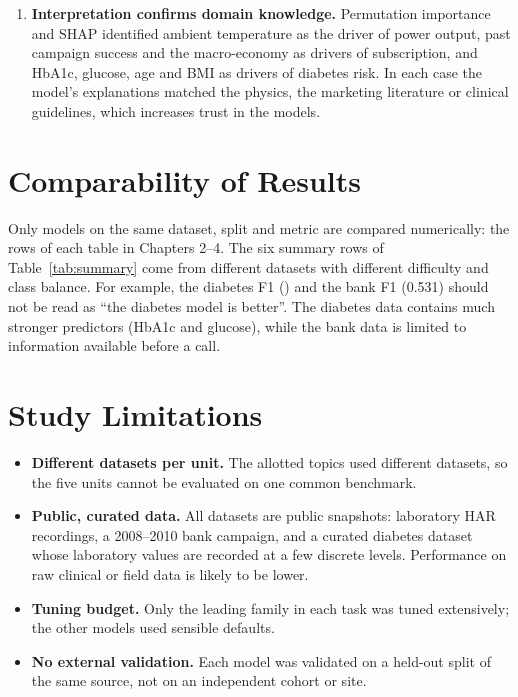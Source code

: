 \begin{enumerate}
\item \textbf{Interpretation confirms domain knowledge.} Permutation importance and SHAP identified ambient temperature
as the driver of power output, past campaign success and the macro-economy as drivers of subscription, and HbA1c,
glucose, age and BMI as drivers of diabetes risk. In each case the model's explanations matched the physics, the
marketing literature or clinical guidelines, which increases trust in the models.
\end{enumerate}

\section{Comparability of Results}
Only models on the same dataset, split and metric are compared numerically: the rows of each table in Chapters 2–4.
The six summary rows of Table~\ref{tab:summary} come from different datasets with different difficulty and class
balance. For example, the diabetes F1 (\dbBestFone) and the bank F1 (0.531) should not be read as ``the diabetes model is
better''. The diabetes data contains much stronger predictors (HbA1c and glucose), while the bank data is limited to
information available before a call.

\section{Study Limitations}
\begin{itemize}
\item \textbf{Different datasets per unit.} The allotted topics used different datasets, so the five units cannot be
evaluated on one common benchmark.
\item \textbf{Public, curated data.} All datasets are public snapshots: laboratory HAR recordings, a 2008–2010 bank
campaign, and a curated diabetes dataset whose laboratory values are recorded at a few discrete levels. Performance on
raw clinical or field data is likely to be lower.
\item \textbf{Tuning budget.} Only the leading family in each task was tuned extensively; the other models used
sensible defaults.
\item \textbf{No external validation.} Each model was validated on a held-out split of the same source, not on an
independent cohort or site.
\end{itemize}

